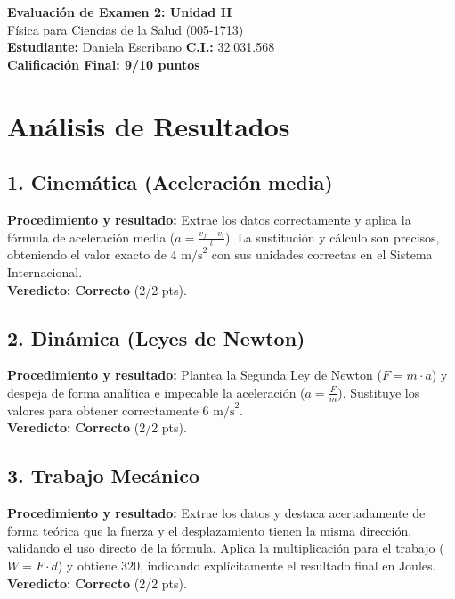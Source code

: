 \documentclass[12pt,letterpaper]{article}
\begin{document}
\begin{center}
    \Large \textbf{Evaluación de Examen 2: Unidad II} \\
    \large Física para Ciencias de la Salud (005-1713) \\
    \vspace{0.5cm}
    \textbf{Estudiante:} Daniela Escribano \quad \textbf{C.I.:} 32.031.568
    \vspace{0.3cm} \\
    \large \textbf{Calificación Final: 9/10 puntos}
\end{center}

\vspace{0.5cm}

\section*{Análisis de Resultados}

\subsection*{1. Cinemática (Aceleración media)}
\textbf{Procedimiento y resultado:} Extrae los datos correctamente y aplica la fórmula de aceleración media ($a = \frac{v_f - v_i}{t}$). La sustitución y cálculo son precisos, obteniendo el valor exacto de $4 \text{ m/s}^2$ con sus unidades correctas en el Sistema Internacional. \\
\textbf{Veredicto:} \textbf{Correcto} (2/2 pts).

\subsection*{2. Dinámica (Leyes de Newton)}
\textbf{Procedimiento y resultado:} Plantea la Segunda Ley de Newton ($F = m \cdot a$) y despeja de forma analítica e impecable la aceleración ($a = \frac{F}{m}$). Sustituye los valores para obtener correctamente $6 \text{ m/s}^2$. \\
\textbf{Veredicto:} \textbf{Correcto} (2/2 pts).

\subsection*{3. Trabajo Mecánico}
\textbf{Procedimiento y resultado:} Extrae los datos y destaca acertadamente de forma teórica que la fuerza y el desplazamiento tienen la misma dirección, validando el uso directo de la fórmula. Aplica la multiplicación para el trabajo ($W = F \cdot d$) y obtiene $320$, indicando explícitamente el resultado final en Joules. \\
\textbf{Veredicto:} \textbf{Correcto} (2/2 pts).
\end{document}
